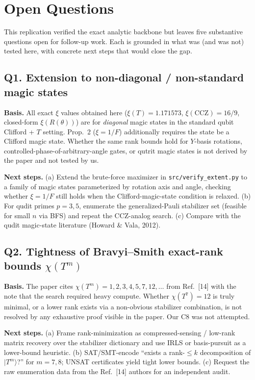 \section{Open Questions}

This replication verified the exact analytic backbone but leaves five substantive
questions open for follow-up work. Each is grounded in what was (and was not) tested
here, with concrete next steps that would close the gap.

\subsection*{Q1. Extension to non-diagonal / non-standard magic states}
\textbf{Basis.} All exact $\xi$ values obtained here ($\xi(T) = 1.171573$,
$\xi(\mathrm{CCZ}) = 16/9$, closed-form $\xi(R(\theta))$) are for \emph{diagonal}
magic states in the standard qubit Clifford + $T$ setting. Prop.~2 ($\xi = 1/F$)
additionally requires the state be a Clifford magic state. Whether the same rank
bounds hold for $Y$-basis rotations, controlled-phase-of-arbitrary-angle gates,
or qutrit magic states is not derived by the paper and not tested by us.

\textbf{Next steps.} (a) Extend the brute-force maximizer in
\texttt{src/verify\_extent.py} to a family of magic states parameterized by rotation
axis and angle, checking whether $\xi = 1/F$ still holds when the Clifford-magic-state
condition is relaxed. (b) For qudit primes $p = 3, 5$, enumerate the generalized-Pauli
stabilizer set (feasible for small $n$ via BFS) and repeat the CCZ-analog search.
(c) Compare with the qudit magic-state literature (Howard \& Vala, 2012).

\subsection*{Q2. Tightness of Bravyi--Smith exact-rank bounds $\chi(T^m)$}
\textbf{Basis.} The paper cites $\chi(T^m) = 1, 2, 3, 4, 5, 7, 12, \ldots$ from Ref.~[14]
with the note that the search required heavy compute. Whether $\chi(T^7) = 12$ is
truly minimal, or a lower rank exists via a non-obvious stabilizer combination, is
not resolved by any exhaustive proof visible in the paper. Our C8 was not attempted.

\textbf{Next steps.} (a) Frame rank-minimization as compressed-sensing / low-rank
matrix recovery over the stabilizer dictionary and use IRLS or basis-pursuit as a
lower-bound heuristic. (b) SAT/SMT-encode ``exists a rank-$\leq k$ decomposition of
$|T^m\rangle$?'' for $m = 7, 8$; UNSAT certificates yield tight lower bounds.
(c) Request the raw enumeration data from the Ref.~[14] authors for an independent
audit.

